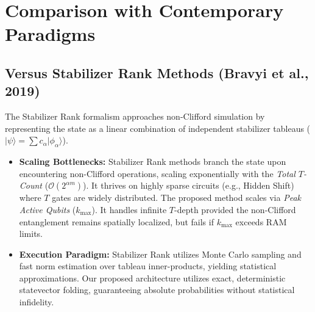 \documentclass[11pt]{article}
\begin{document}
\section{Comparison with Contemporary Paradigms}
\label{sec:comparison}

\subsection{Versus Stabilizer Rank Methods (Bravyi et al., 2019)}
The Stabilizer Rank formalism \cite{bravyi2019} approaches non-Clifford simulation by representing the state as a linear combination of independent stabilizer tableaus ($|\psi\rangle = \sum c_\alpha |\phi_\alpha\rangle$).
\begin{itemize}
    \item \textbf{Scaling Bottlenecks:} Stabilizer Rank methods branch the state upon encountering non-Clifford operations, scaling exponentially with the \textit{Total $T$-Count} ($\mathcal{O}(2^{\alpha m})$). It thrives on highly sparse circuits (e.g., Hidden Shift) where $T$ gates are widely distributed. The proposed method scales via \textit{Peak Active Qubits} ($k_{\max}$). It handles infinite $T$-depth provided the non-Clifford entanglement remains spatially localized, but fails if $k_{\max}$ exceeds RAM limits.
    \item \textbf{Execution Paradigm:} Stabilizer Rank utilizes Monte Carlo sampling and fast norm estimation over tableau inner-products, yielding statistical approximations. Our proposed architecture utilizes exact, deterministic statevector folding, guaranteeing absolute probabilities without statistical infidelity.
\end{itemize}
\end{document}
